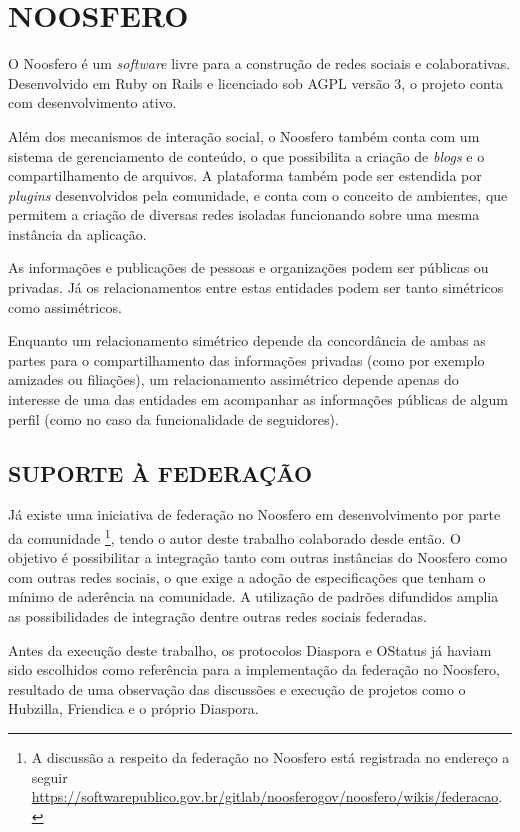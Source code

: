 \chapter{NOOSFERO}
\label{chapter:3}

O Noosfero é um \textit{software} livre para a construção de redes sociais e
colaborativas. Desenvolvido em Ruby on Rails e licenciado sob AGPL versão 3, o
projeto conta com desenvolvimento ativo.

Além dos mecanismos de interação social, o Noosfero também conta com um sistema de
gerenciamento de conteúdo, o que possibilita a criação de \textit{blogs} e o
compartilhamento de arquivos. A plataforma também pode ser estendida por
\textit{plugins} desenvolvidos pela comunidade, e conta com o conceito de ambientes,
que permitem a criação de diversas redes isoladas funcionando sobre uma mesma
instância da aplicação.

As informações e publicações de pessoas e organizações podem ser públicas ou
privadas. Já os relacionamentos entre estas entidades podem ser tanto simétricos
como assimétricos.

Enquanto um relacionamento simétrico depende da concordância de ambas as partes para
o compartilhamento das informações privadas (como por exemplo amizades ou
filiações), um relacionamento assimétrico depende apenas do interesse de uma das
entidades em acompanhar as informações públicas de algum perfil (como no caso da
funcionalidade de seguidores).



\section{SUPORTE À FEDERAÇÃO}

Já existe uma iniciativa de federação no Noosfero em desenvolvimento por parte da
comunidade \footnote{A discussão a respeito da federação no Noosfero está registrada
no endereço a seguir
\url{https://softwarepublico.gov.br/gitlab/noosferogov/noosfero/wikis/federacao}.},
tendo o autor deste trabalho colaborado desde então. O objetivo é possibilitar a
integração tanto com outras instâncias do Noosfero como com outras redes sociais, o
que exige a adoção de especificações que tenham o mínimo de aderência na comunidade.
A utilização de padrões difundidos amplia as possibilidades de integração dentre
outras redes sociais federadas.

Antes da execução deste trabalho, os protocolos Diaspora e OStatus já haviam sido
escolhidos como referência para a implementação da federação no Noosfero, resultado
de uma observação das discussões e execução de projetos como o Hubzilla, Friendica e
o próprio Diaspora.

